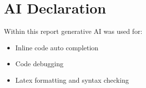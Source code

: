 \section{AI Declaration}
Within this report generative AI was used for:
\begin{itemize}
  \item Inline code auto completion
  \item Code debugging
  \item Latex formatting and syntax checking
\end{itemize}
